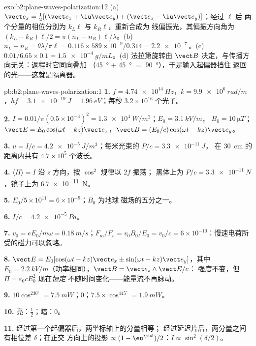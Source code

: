 \begin{solution}{exo:b2:plane-waves-polarization:12}
(a) $\vect e_x = \tfrac12[(\vect e_x + \iu\vect e_y) + (\vect e_x - \iu\vect e_y)]$；经过 $\ell$ 后
两个分量的相位分别为 $k_L\ell$ 与 $k_R\ell$，重新合成为
线偏振光，其偏振方向角为 $(k_L - k_R)\ell/2 = \pi(n_L - n_R)\ell/\lambda$。(b) $n_L -
n_R = \theta\lambda/\pi\ell = 0.116 \times 589 \times 10^{-9}/0.314 = \qty{2.2e-7}{}$。(c)
$0.01/6.65 \times 0.1 = \qty{1.5e-4}{g/mL}$。(d) 法拉第旋转由
$\vect B$ 决定，与传播方向无关：返程时它同向叠加
（\qty{45}{\degree} $+$ \qty{45}{\degree} $=$ \qty{90}{\degree}），于是输入起偏器挡住
返回的光——这就是隔离器。
\end{solution}

\begin{solution}{pb:b2:plane-waves-polarization:1}
\textbf{1.} $f = \qty{4.74e14}{Hz}$，$k = \qty{9.9e6}{rad/m}$，$hf = \qty{3.1e-19}{J} =
\qty{1.96}{eV}$；每秒 $3.2 \times 10^{16}$ 个光子。

\textbf{2.} $I = 0.01/\pi(0.5 \times 10^{-3})^2 = \qty{1.3e4}{W/m^2}$；$E_0 = \qty{3.1}{kV/m}$，
$B_0 = \qty{10}{\micro T}$；$\vect E = E_0\cos(\omega t - kz)\vect e_x$，$\vect B = (E_0/c)\cos(\omega t
- kz)\vect e_y$。

\textbf{3.} $u = I/c = \qty{4.2e-5}{J/m^3}$；每米光束的 $P/c = \qty{3.3e-11}{J}$，
在 \qty{30}{cm} 的距离内共有 $4.7 \times 10^5$ 个波长。

\textbf{4.} $\langle\Pi\rangle = I$ 沿 $z$ 方向，按 $\cos^2$ 规律以 $2f$ 振荡；
黑体上为 $P/c = \qty{3.3e-11}{N}$，镜子上为 \qty{6.7e-11}{N}。

\textbf{5.} $E_0/5 \times 10^{11} = 6 \times 10^{-9}$；$B_0$ 为地球
磁场的五分之一。

\textbf{6.} $I/c = \qty{4.2e-5}{Pa}$。

\textbf{7.} $v_0 = eE_0/m\omega = \qty{0.18}{m/s}$；$F_m/F_e = v_0B_0/E_0 = v_0/c = 6 \times
10^{-10}$：慢速电荷所受的磁力可以忽略。

\textbf{8.} $\vect E = E_0[\cos(\omega t - kz)\vect e_x \pm \sin(\omega t - kz)\vect e_y]$，其中
$E_0 = \qty{2.2}{kV/m}$（功率相同），$\vect B = \vect e_z\wedge\vect E/c$：
强度不变，但 $\Pi = \varepsilon_0cE_0^2$ 现在\emph{恒定}
不随时间变化——能量流不再脉动。

\textbf{9.} $10\cos^230^\circ = \qty{7.5}{mW}$；$0$；$7.5 \times \cos^445^\circ = \qty{1.9}{mW}$。

\textbf{10.} 亮：$\tfrac12$；暗：$0$。

\textbf{11.} 经过第一个起偏器后，两坐标轴上的分量相等；
经过延迟片后，两分量之间有相位差 $\delta$；在正交
方向上的投影 $\propto(1 - \eu^{\iu\delta})/2$：$I \propto \sin^2(\delta/2)$。


\end{solution}

